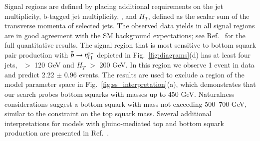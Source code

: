 Signal regions are defined by placing additional requirements on the jet multiplicity, b-tagged jet multiplicity, 
\met, and $H_T$, defined as the scalar sum of the transverse momenta of selected jets. 
The observed data yields in all signal regions are in good agreement with the SM background expectations;
see Ref.~\cite{ref:ss} for the full quantitative results. The signal region that is most sensitive to 
bottom squark pair production with $\tilde{b}\to t \tilde{\chi}_{1}^{-}$ depicted in Fig.~\ref{fig:diagrams}(d) 
has at least four jets, \met\ $>$ 120 GeV and
$H_T$ $>$ 200 GeV. In this region we observe 1 event in data and predict 2.22 $\pm$ 0.96 events.
The results are used to exclude a region of the model parameter space in Fig.~\ref{fig:ss_interpretation}(a),
which demonstrates that our search probes bottom squarks with masses up to 450 GeV.
Naturalness considerations suggest a bottom squark with mass not exceeding 500--700 GeV, similar to the constraint
on the top squark mass.
Several additional interpretations for models with gluino-mediated top and 
bottom squark production are presented in Ref.~\cite{ref:ss}.

%



